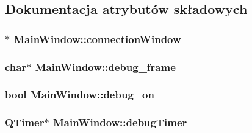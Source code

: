 \subsection{Dokumentacja atrybutów składowych}
\subsubsection[{\texorpdfstring{connection\+Window}{connectionWindow}}]{$\ast$ Main\+Window\+::connection\+Window\hspace{0.3cm}{\ttfamily [private]}}\hypertarget{class_main_window_acdf7c3f40019c435964111615d084abd}{}\label{class_main_window_acdf7c3f40019c435964111615d084abd}
\subsubsection[{\texorpdfstring{debug\+\_\+frame}{debug_frame}}]{\setlength{\rightskip}{0pt plus 5cm}char$\ast$ Main\+Window\+::debug\+\_\+frame\hspace{0.3cm}{\ttfamily [private]}}\hypertarget{class_main_window_ae56bcafb6e46026ab75940212f9b871d}{}\label{class_main_window_ae56bcafb6e46026ab75940212f9b871d}
\subsubsection[{\texorpdfstring{debug\+\_\+on}{debug_on}}]{\setlength{\rightskip}{0pt plus 5cm}bool Main\+Window\+::debug\+\_\+on\hspace{0.3cm}{\ttfamily [private]}}\hypertarget{class_main_window_acc93e4640de90d7cf05f44dc6678f412}{}\label{class_main_window_acc93e4640de90d7cf05f44dc6678f412}
\subsubsection[{\texorpdfstring{debug\+Timer}{debugTimer}}]{\setlength{\rightskip}{0pt plus 5cm}Q\+Timer$\ast$ Main\+Window\+::debug\+Timer\hspace{0.3cm}{\ttfamily [private]}}\hypertarget{class_main_window_a854823622594d31964edae0a1ea6ab57}{}\label{class_main_window_a854823622594d31964edae0a1ea6ab57}
